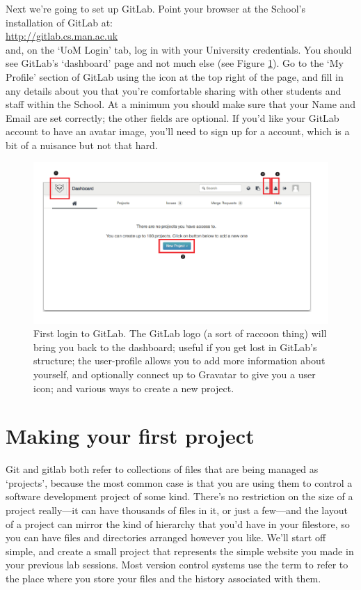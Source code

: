 Next we're going to set up GitLab. Point your browser at the School's installation of GitLab at:
\\
\url{http://gitlab.cs.man.ac.uk}
\\
and, on the `UoM Login' tab, log in with your University credentials. You should see GitLab's `dashboard' page and not much else (see Figure \ref{figure:GitLab-first-login}). Go to the `My Profile' section of GitLab using the icon at the top right of the page, and fill in any details about you that you're comfortable sharing with other students and staff within the School. At a minimum you should make sure that your Name and Email are set correctly; the other fields are optional. If you'd like your GitLab account to have an avatar image, you'll need to sign up for a  account, which is a bit of a nuisance but not that hard.

\begin{figure}
\centerline{\includegraphics[width=15cm]{images/GitLab-first-login}}
\caption{First login to GitLab. \protect{} The GitLab logo (a sort of raccoon thing) will bring you back to the dashboard; useful if you get lost in GitLab's structure; \protect{} the user-profile allows you to add more information about yourself, and optionally connect up to Gravatar to give you a user icon; and \protect{} various ways to create a new project.}\label{figure:GitLab-first-login}
\end{figure}

\section{Making your first project}

Git and gitlab both refer to collections of files that are being managed as `projects', because the most common case is that you are using them to control a software development project of some kind. There's no restriction on the size of a project really---it can have thousands of files in it, or just a few---and the layout of a project can mirror the kind of hierarchy that you'd have in your filestore, so you can have files and directories arranged however you like. We'll start off simple, and create a small project that represents the simple website you made in your previous lab sessions. Most version control systems use the term  to refer to the place where you store your files and the history associated with them. 

